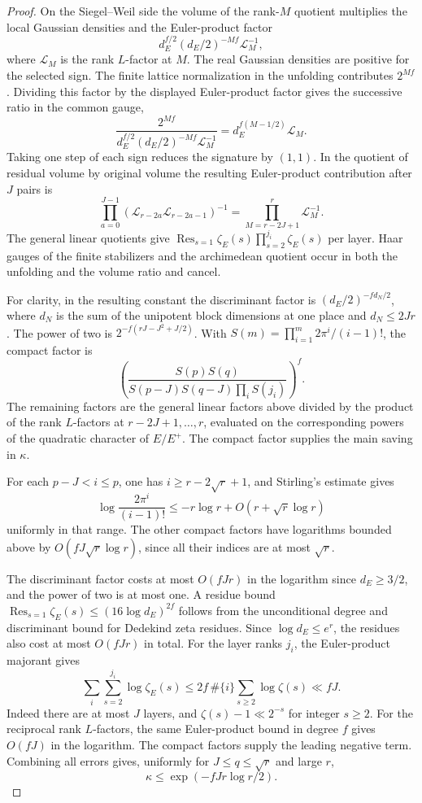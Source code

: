 \begin{proof}
On the Siegel--Weil
side the volume of the rank-\(M\) quotient multiplies
the local Gaussian densities and the Euler-product factor
\[
             d_E^{f/2}(d_E/2)^{-Mf}\mathcal L_M^{-1},
\]
where \(\mathcal L_M\) is the rank \(L\)-factor at \(M\).
The real Gaussian densities are positive for the selected
sign. The finite lattice normalization in the unfolding
contributes \(2^{Mf}\). Dividing this factor by the displayed
Euler-product factor gives the successive ratio in the common gauge,
\[
 \frac{2^{Mf}}{d_E^{f/2}(d_E/2)^{-Mf}\mathcal L_M^{-1}}
          =d_E^{f(M-1/2)}\mathcal L_M .
\]
Taking one step of each sign reduces the signature by \((1,1)\).
In the quotient of residual volume by original volume the resulting
Euler-product contribution after \(J\) pairs is
\[
 \prod_{a=0}^{J-1}(\mathcal L_{r-2a}\mathcal L_{r-2a-1})^{-1}
                 =\prod_{M=r-2J+1}^r \mathcal L_M^{-1}.
\] The general linear quotients give
\(\operatorname{Res}_{s=1}\zeta_E(s)\prod_{s=2}^{j_i}\zeta_E(s)\)
per layer. Haar gauges of the finite stabilizers and the
archimedean quotient occur in both the unfolding and the
volume ratio and cancel.

For clarity, in the resulting constant the discriminant
factor is \((d_E/2)^{-fd_N/2}\), where \(d_N\) is the sum
of the unipotent block dimensions at one place and
\(d_N\le2Jr\). The power of two is
\(2^{-f(rJ-J^2+J/2)}\). With \(S(m)=\prod_{i=1}^m
2\pi^i/(i-1)!\), the compact factor is
\[
 \left(\frac{S(p)S(q)}
              {S(p-J)S(q-J)\prod_i S(j_i)}\right)^f.
\]
The remaining factors are the general linear factors above
divided by the product of the rank \(L\)-factors at
\(r-2J+1,\ldots,r\), evaluated on the corresponding powers
of the quadratic character of \(E/E^+\).
The compact factor supplies the main saving in \(\kappa\).

For each \(p-J<i\le p\), one has \(i\ge r-2\sqrt r+1\),
and Stirling's estimate gives
\[
   \log\frac{2\pi^i}{(i-1)!}
            \le -r\log r+O(r+\sqrt r\log r)
\]
uniformly in that range. The other compact factors have
logarithms bounded above by \(O(fJ\sqrt r\log r)\), since
all their indices are at most \(\sqrt r\).

The discriminant factor costs at most \(O(fJr)\) in the
logarithm since \(d_E\ge3/2\), and the power of two is at most
one. A residue bound
\(\operatorname{Res}_{s=1}\zeta_E(s)\le
(16\log d_E)^{2f}\) follows from the unconditional degree
and discriminant bound for Dedekind zeta residues.
Since \(\log d_E\le e^r\), the residues also cost at most
\(O(fJr)\) in total. For the layer ranks \(j_i\), the Euler-product majorant gives
\[
 \sum_i\sum_{s=2}^{j_i}\log\zeta_E(s)
 \le 2f\,\#\{i\}\sum_{s\ge2}\log\zeta(s)\ll fJ .
\]
Indeed there are at most \(J\) layers, and \(\zeta(s)-1\ll2^{-s}\)
for integer \(s\ge2\).
For the reciprocal rank \(L\)-factors, the same Euler-product
bound in degree \(f\) gives \(O(fJ)\) in the logarithm.
The compact factors supply the leading negative term. Combining all
errors gives, uniformly for \(J\le q\le\sqrt r\) and large \(r\),
\[
                         \kappa\le \exp(-fJr\log r/2).
\]
\hfill\mbox{\cite{louboutin-row-count}}\label{cor:geometry-dimension-1}


\end{proof}
